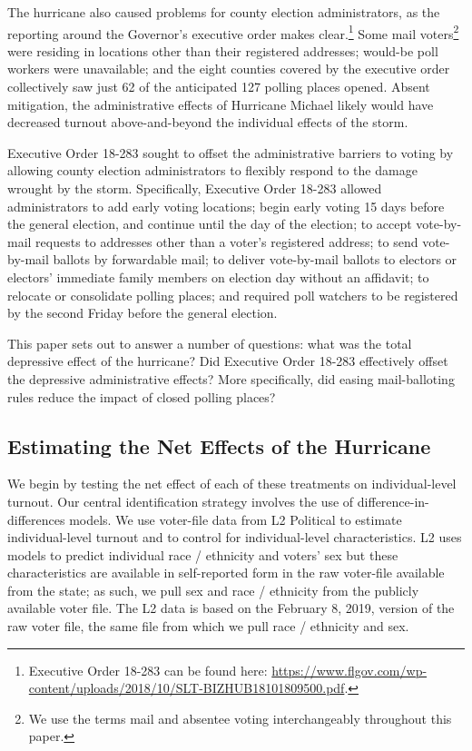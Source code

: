 \documentclass[
  12pt,
]{article}
\begin{document}
The hurricane also caused problems for county election administrators, as the reporting around the Governor's executive order makes clear.\footnote{Executive Order 18-283 can be found here: \url{https://www.flgov.com/wp-content/uploads/2018/10/SLT-BIZHUB18101809500.pdf}.} Some mail voters\footnote{We use the terms mail and absentee voting interchangeably throughout this paper.} were residing in locations other than their registered addresses; would-be poll workers were unavailable; and the eight counties covered by the executive order collectively saw just 62 of the anticipated 127 polling places opened. Absent mitigation, the administrative effects of Hurricane Michael likely would have decreased turnout above-and-beyond the individual effects of the storm.

Executive Order 18-283 sought to offset the administrative barriers to voting by allowing county election administrators to flexibly respond to the damage wrought by the storm. Specifically, Executive Order 18-283 allowed administrators to add early voting locations; begin early voting 15 days before the general election, and continue until the day of the election; to accept vote-by-mail requests to addresses other than a voter's registered address; to send vote-by-mail ballots by forwardable mail; to deliver vote-by-mail ballots to electors or electors' immediate family members on election day without an affidavit; to relocate or consolidate polling places; and required poll watchers to be registered by the second Friday before the general election.

This paper sets out to answer a number of questions: what was the total depressive effect of the hurricane? Did Executive Order 18-283 effectively offset the depressive administrative effects? More specifically, did easing mail-balloting rules reduce the impact of closed polling places?

\hypertarget{estimating-the-net-effects-of-the-hurricane}{%
\subsection*{Estimating the Net Effects of the Hurricane}\label{estimating-the-net-effects-of-the-hurricane}}

We begin by testing the net effect of each of these treatments on individual-level turnout. Our central identification strategy involves the use of difference-in-differences models. We use voter-file data from L2 Political to estimate individual-level turnout and to control for individual-level characteristics. L2 uses models to predict individual race / ethnicity and voters' sex but these characteristics are available in self-reported form in the raw voter-file available from the state; as such, we pull sex and race / ethnicity from the publicly available voter file. The L2 data is based on the February 8, 2019, version of the raw voter file, the same file from which we pull race / ethnicity and sex.
\end{document}
